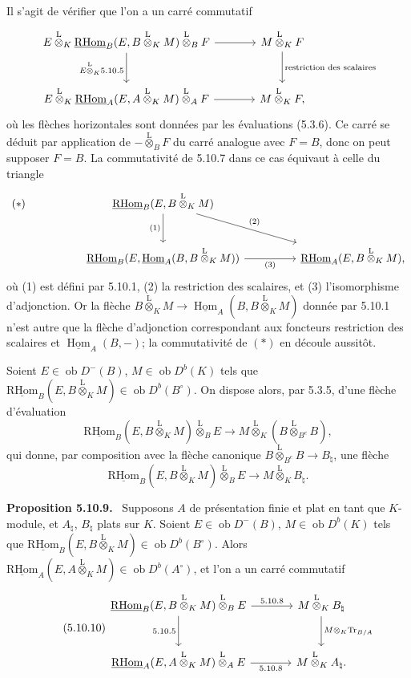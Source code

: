 \documentclass[11pt]{article}
\newenvironment{statement}[1]{\par\medskip\noindent\textbf{#1.}\ }{\par\medskip}
\DeclareMathOperator{\Hom}{Hom}
\newcommand{\ob}{\operatorname{ob}}
\providecommand{\RHom}{\mathrm{RHom}}
\providecommand{\uRHom}{\underline{\RHom}}
\providecommand{\uHom}{\underline{\Hom}}
\providecommand{\Tr}{\operatorname{Tr}}
\providecommand{\Tr}{\operatorname{Tr}}
\providecommand{\lten}{\overset{\mathrm L}{\otimes}}
\providecommand{\Tr}{\operatorname{Tr}}
\providecommand{\RHom}{\mathrm{RHom}}
\providecommand{\Hom}{\operatorname{Hom}}
\providecommand{\ob}{\operatorname{ob}}
\providecommand{\lten}{\overset{\mathrm L}{\otimes}}
\providecommand{\RHom}{\mathrm R\mathcal{H}om}
\providecommand{\lten}{\overset{\mathrm L}{\otimes}}
\providecommand{\Tr}{\operatorname{Tr}}
\providecommand{\lten}{\overset{\mathrm L}{\otimes}}
\providecommand{\lten}{\overset{\mathrm L}{\otimes}}
\providecommand{\lten}{\overset{\mathrm L}{\otimes}}
\providecommand{\RHom}{\mathrm{RHom}}
\providecommand{\Hom}{\operatorname{Hom}}
\providecommand{\Tr}{\operatorname{Tr}}
\providecommand{\lten}{\overset{\mathrm L}{\otimes}}
\begin{document}
Il s'agit de vérifier que l'on a un carré commutatif
\[
\begin{tikzcd}[column sep=large,row sep=large]
E\lten_K\uRHom_B(E,B\lten_KM)\lten_BF \arrow[r] \arrow[d,"E\lten_K5.10.5"'] & M\lten_KF \arrow[d,"\text{restriction des scalaires}"]\\
E\lten_K\uRHom_A(E,A\lten_KM)\lten_AF \arrow[r] & M\lten_KF,
\end{tikzcd}
\]
où les flèches horizontales sont données par les évaluations (5.3.6). Ce carré se déduit par application de $-\lten_BF$ du carré analogue avec $F=B$, donc on peut supposer $F=B$. La commutativité de 5.10.7 dans ce cas équivaut à celle du triangle
\[
\begin{tikzcd}[column sep=huge,row sep=large]
|[alias=star]| {(*)} & \uRHom_B(E,B\lten_KM) \arrow[d,"(1)"'] \arrow[dr,"(2)"] & \\
& \uRHom_B(E,\uHom_A(B,B\lten_KM)) \arrow[r,"(3)"'] & \uRHom_A(E,B\lten_KM),
\end{tikzcd}
\]
où (1) est défini par 5.10.1, (2) la restriction des scalaires, et (3) l'isomorphisme d'adjonction. Or la flèche $B\lten_KM\to\uHom_A(B,B\lten_KM)$ donnée par 5.10.1 n'est autre que la flèche d'adjonction correspondant aux foncteurs restriction des scalaires et $\uHom_A(B,-)$; la commutativité de $(*)$ en découle aussitôt.

Soient $E\in\ob D^-(B)$, $M\in\ob D^b(K)$ tels que $\uRHom_B(E,B\lten_KM)\in\ob D^b(B^\circ)$. On dispose alors, par 5.3.5, d'une flèche d'évaluation
\[
\uRHom_B(E,B\lten_KM)\lten_BE\longrightarrow M\lten_K(B\lten_{B^e}B),
\]
qui donne, par composition avec la flèche canonique $B\lten_{B^e}B\to B_\natural$, une flèche
\begin{equation}\tag{5.10.8}
\uRHom_B(E,B\lten_KM)\lten_BE\longrightarrow M\lten_KB_\natural.
\end{equation}

\begin{statement}{Proposition 5.10.9}
Supposons $A$ de présentation finie et plat en tant que $K$-module, et $A_\natural$, $B_\natural$ plats sur $K$. Soient $E\in\ob D^-(B)$, $M\in\ob D^b(K)$ tels que $\uRHom_B(E,B\lten_KM)\in\ob D^b(B^\circ)$. Alors $\uRHom_A(E,A\lten_KM)\in\ob D^b(A^\circ)$, et l'on a un carré commutatif
\begin{equation}\tag{5.10.10}
\begin{tikzcd}[column sep=large,row sep=large]
\uRHom_B(E,B\lten_KM)\lten_BE \arrow[r,"5.10.8"] \arrow[d,"5.10.5"'] & M\lten_KB_\natural \arrow[d,"M\otimes_K\Tr_{B/A}"]\\
\uRHom_A(E,A\lten_KM)\lten_AE \arrow[r,"5.10.8"'] & M\lten_KA_\natural .
\end{tikzcd}
\end{equation}
\end{statement}
\end{document}

